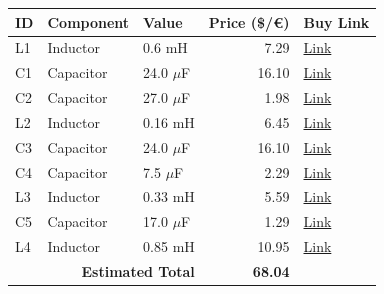 \begin{table}[H]
    \centering
    \renewcommand{\arraystretch}{1.5}
    \begin{tabular}{@{}lllrl@{}}
        \toprule
        \textbf{ID} & \textbf{Component} & \textbf{Value} & \textbf{Price (\$/€)} & \textbf{Buy Link} \\
        \midrule
        L1 & Inductor & 0.6 mH & 7.29 & \href{https://www.parts-express.com/Jantzen-1951-0.60mH-18-AWG-Air-Core-Inductor-255-234}{Link} \\
        C1 & Capacitor & 24.0 $\mu$F & 16.10 & \href{https://www.parts-express.com/Solen-24uF-400V-Polypropylene-Capacitor-027-586}{Link} \\
        C2 & Capacitor & 27.0 $\mu$F & 1.98 & \href{https://www.soundimports.eu/en/jantzen-audio-001-6150.html}{Link} \\
        L2 & Inductor & 0.16 mH & 6.45 & \href{https://www.soundimports.eu/en/jantzen-audio-000-1627.html}{Link} \\
        C3 & Capacitor & 24.0 $\mu$F & 16.10 & \href{https://www.parts-express.com/Solen-24uF-400V-Polypropylene-Capacitor-027-586}{Link} \\
        C4 & Capacitor & 7.5 $\mu$F & 2.29 & \href{https://www.parts-express.com/Solen-7.5uF-400V-Polypropylene-Capacitor-027-562}{Link} \\
        L3 & Inductor & 0.33 mH & 5.59 & \href{https://www.parts-express.com/Dayton-Audio-LW18-33-0.33mH-18-AWG-Perfect-Layer-Inductor-257-812}{Link} \\
        C5 & Capacitor & 17.0 $\mu$F & 1.29 & \href{https://www.parts-express.com/17uF-100V-Non-Polarized-Capacitor-027-346}{Link} \\
        L4 & Inductor & 0.85 mH & 10.95 & \href{https://www.soundimports.eu/en/jantzen-audio-000-1284.html}{Link} \\
        \midrule
        \multicolumn{3}{r}{\textbf{Estimated Total}} & \textbf{68.04} & \\
        \bottomrule
    \end{tabular}
\end{table}
